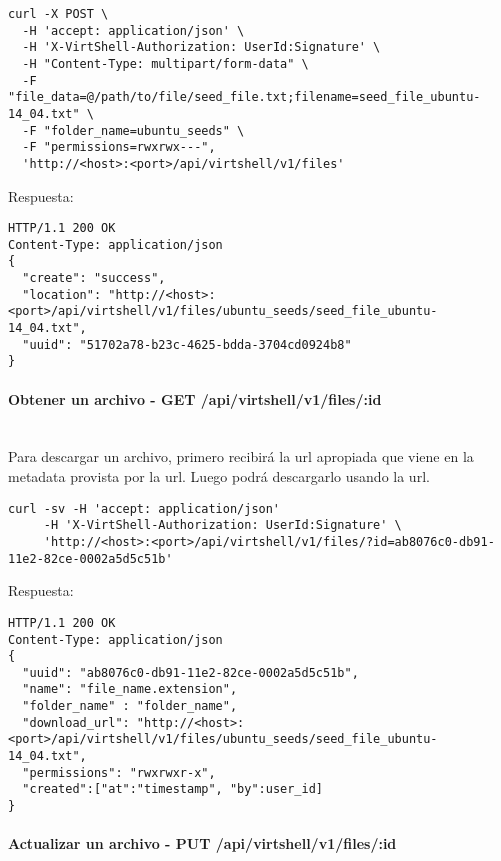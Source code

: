 \begin{lstlisting}[style=json]
curl -X POST \
  -H 'accept: application/json' \
  -H 'X-VirtShell-Authorization: UserId:Signature' \
  -H "Content-Type: multipart/form-data" \
  -F "file_data=@/path/to/file/seed_file.txt;filename=seed_file_ubuntu-14_04.txt" \
  -F "folder_name=ubuntu_seeds" \
  -F "permissions=rwxrwx---",
  'http://<host>:<port>/api/virtshell/v1/files'
\end{lstlisting}

\vspace{1cm}
Respuesta:
\vspace{1cm}

\begin{lstlisting}[style=json]
HTTP/1.1 200 OK
Content-Type: application/json
{ 
  "create": "success",
  "location": "http://<host>:<port>/api/virtshell/v1/files/ubuntu_seeds/seed_file_ubuntu-14_04.txt",
  "uuid": "51702a78-b23c-4625-bdda-3704cd0924b8" 
}
\end{lstlisting}

\paragraph{Obtener un archivo - GET /api/virtshell/v1/files/:id} ~\\

Para descargar un archivo, primero recibirá la url apropiada que viene en la metadata provista por la url. Luego podrá descargarlo usando la url.

\begin{lstlisting}[style=json]
curl -sv -H 'accept: application/json' 
     -H 'X-VirtShell-Authorization: UserId:Signature' \ 
     'http://<host>:<port>/api/virtshell/v1/files/?id=ab8076c0-db91-11e2-82ce-0002a5d5c51b'
\end{lstlisting}

\vspace{1cm}
Respuesta:
\vspace{1cm}

\begin{lstlisting}[style=json]
HTTP/1.1 200 OK
Content-Type: application/json
{
  "uuid": "ab8076c0-db91-11e2-82ce-0002a5d5c51b",
  "name": "file_name.extension",
  "folder_name" : "folder_name",
  "download_url": "http://<host>:<port>/api/virtshell/v1/files/ubuntu_seeds/seed_file_ubuntu-14_04.txt",
  "permissions": "rwxrwxr-x",
  "created":["at":"timestamp", "by":user_id] 
}
\end{lstlisting}

\paragraph{Actualizar un archivo - PUT /api/virtshell/v1/files/:id} ~\\

